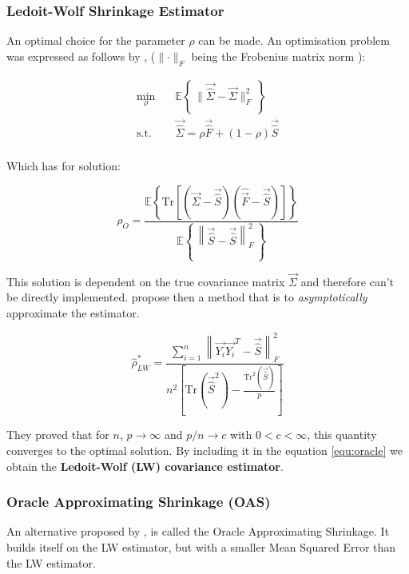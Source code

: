 \subsubsection{Ledoit-Wolf Shrinkage Estimator}

An optimal choice for the parameter $\rho$ can be made. An optimisation problem was expressed as follows by \citet{ledoit_well-conditioned_2004}, ($\lVert  \cdot \rVert_F$ being the Frobenius matrix norm ):

\begin{align}
    \min_\rho \quad & \mathbb{E}\left\{ \, \lVert \vec{\hat{\Sigma}} - \vec{\Sigma} \rVert_F^2 \, \right\} \\
    \text{s.t.} \quad &  \vec{\hat{\Sigma}} = \rho\vec{\hat{F}} + (1- \rho )\vec{\hat{S}} \\
\end{align}

Which has for solution: 

\begin{equation}
    \rho_O = \frac{\mathbb{E}\left\{\text{Tr}[(\vec{\Sigma} -\vec{\hat{S}} ) (\hat{\vec{F}} -\vec{\hat{S}} )]\right\}}{\mathbb{E}\left\{ \, \left\lVert \vec{\hat{S}} -\vec{\hat{S}} \right\rVert_F^2 \, \right\}}
\end{equation}


This solution is dependent on the true covariance matrix $\vec{\Sigma}$ and therefore can't be directly implemented. \citet{ledoit_well-conditioned_2004} propose then a method that is to \textit{asymptotically} approximate the estimator. 

\begin{equation}
    \hat{\rho}_{LW}^* =  \frac{\sum_{i=1}^n \left\lVert \vec{Y_i}\vec{Y_i}^T - \vec{\hat{S}} \right\rVert_F^2   }{n^2 \left[ \text{Tr}( \vec{\hat{S}} ^2) - \frac{ \text{Tr}^2( \vec{\hat{S}} ) }{p} \right]}
\end{equation}

They proved that for $n,\, p \rightarrow \infty $ and $p/n \rightarrow c $ with $0<c < \infty $, this quantity converges to the optimal solution.  By including it in the equation \ref{equ:oracle} we obtain the \textbf{Ledoit-Wolf (LW) covariance estimator}.



\subsubsection{Oracle Approximating Shrinkage (OAS)}

An alternative proposed by \citet{chen_shrinkage_2010}, is called the Oracle Approximating Shrinkage. It builds itself on the LW estimator, but with a  smaller Mean Squared Error than the LW estimator. \\

